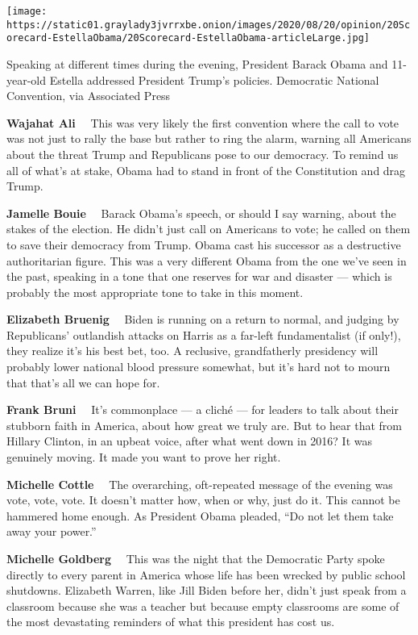 \texttt{[image: https://static01.graylady3jvrrxbe.onion/images/2020/08/20/opinion/20Scorecard-EstellaObama/20Scorecard-EstellaObama-articleLarge.jpg]}

Speaking at different times during the evening, President Barack Obama
and 11-year-old Estella addressed President Trump's policies. Democratic
National Convention, via Associated Press

\textbf{Wajahat Ali}~~ This was very likely the first convention where
the call to vote was not just to rally the base but rather to ring the
alarm, warning all Americans about the threat Trump and Republicans pose
to our democracy. To remind us all of what's at stake, Obama had to
stand in front of the Constitution and drag Trump.

\textbf{Jamelle Bouie}~~ Barack Obama's speech, or should I say warning,
about the stakes of the election. He didn't just call on Americans to
vote; he called on them to save their democracy from Trump. Obama cast
his successor as a destructive authoritarian figure. This was a very
different Obama from the one we've seen in the past, speaking in a tone
that one reserves for war and disaster --- which is probably the most
appropriate tone to take in this moment.

\textbf{Elizabeth Bruenig}~~ Biden is running on a return to normal, and
judging by Republicans' outlandish attacks on Harris as a far-left
fundamentalist (if only!), they realize it's his best bet, too. A
reclusive, grandfatherly presidency will probably lower national blood
pressure somewhat, but it's hard not to mourn that that's all we can
hope for.

\textbf{Frank Bruni}~~ It's commonplace --- a cliché --- for leaders to
talk about their stubborn faith in America, about how great we truly
are. But to hear that from Hillary Clinton, in an upbeat voice, after
what went down in 2016? It was genuinely moving. It made you want to
prove her right.

\textbf{Michelle Cottle}~~ The overarching, oft-repeated message of the
evening was vote, vote, vote. It doesn't matter how, when or why, just
do it. This cannot be hammered home enough. As President Obama pleaded,
``Do not let them take away your power.''

\textbf{Michelle Goldberg}~~ This was the night that the Democratic
Party spoke directly to every parent in America whose life has been
wrecked by public school shutdowns. Elizabeth Warren, like Jill Biden
before her, didn't just speak from a classroom because she was a teacher
but because empty classrooms are some of the most devastating reminders
of what this president has cost us.

